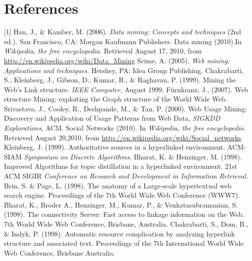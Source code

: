 \documentclass{article}
\begin{document}
\section{References}
[1] Han, J., \& Kamber, M. (2006). \textit{Data mining: Concepts and techniques}      (2nd ed.).  San Francisco, CA: Morgan Kaufmann Publishers.
\newline
[2] Data mining (2010).In \textit{Wikipedia, the free encyclopedia.} Retrieved August 17, 2010, from \url{http://en.wikipedia.org/wiki/Data_Mining}
\newline
[3]  Scime, A. (2005).\textit{ Web mining: Applications and techniques.} Hershey, PA: Idea Group Publishing.
\newline
[4] Chakrabarti, S., Kleinberg, J., Gibson, D., Kumar, R., \& Raghavan, P. (1999). Mining the Web’s Link structure. \textit{IEEE Computer}, August 1999.
\newline
[5]  Fürnkranz, J., (2007). Web structure Mining: exploiting the Graph structure of the World Wide Web.
\newline
[6] Srivastava, J., Cooley, R., Deshpande, M., \& Tan, P. (2000). Web Usage Mining: Discovery and Application of Usage Patterns from Web Data, \textit{SIGKDD Explorations}, ACM.
\newline
[7] Social Networks (2010). In \textit{Wikipedia, the free encyclopedia.} Retrieved August 20,2010,  from \url{http://en.wikipedia.org/wiki/Social_networks}.
\newline
[8] Kleinberg, J. (1999). Authoritative sources in a hyperlinked environment. ACM-SIAM \textit{Symposium on Discrete Algorithms.}
\newline
[9] Bharat, K. \& Henzinger, M. (1998). Improved Algorithms for topic distillation in a hyperlinked environment. 21st ACM SIGIR\textit{ Conference on Research and Development in Information Retrieval.}
\newline
[10] Brin, S. \& Page, L. (1998). The anatomy of a Large-scale hypertextual web search engine. Proceedings of the 7th World Wide Web Conference (WWW7).
\newline
[11]  Bharat, K., Broder A., Henzinger, M., Kumar, P., \& Venkatasubramanian, S. (1998). The connectivity Server: Fast access to linkage information on the Web. 7th World Wide Web Conference, Brisbane, Australia.
\newline
[12] Chakrabarti, S., Dom, B., \& Indyk, P. (1998). Automatic resource complication by analyzing hyperlink structure and associated text. Proceedings of the 7th International World Wide Web Conference, Brisbane Australia.
\end{document}
